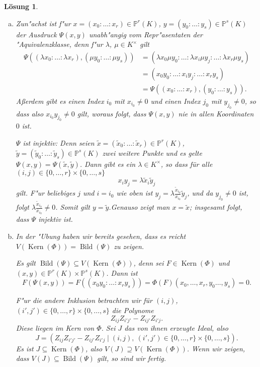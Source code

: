 \documentclass[a4paper, 12pt, numbers=noendperiod, chapterprefix=true, headsepline]{scrbook}
\theoremstyle{break}
\newtheorem{Loes}{L\"osung}
\theoremstyle{nonumberbreak}
\theoremstyle{nonumberplain}
\DeclareMathOperator{\Bild}{Bild}
\DeclareMathOperator{\Kern}{Kern}
\newcommand{\IP}{\mathbb{P}}%
\begin{document}
\begin{Loes}\begin{enumerate}[a)]
\item
	Zun"achst ist f"ur $x = (x_0:\ldots:x_r)\in \IP^r(K)$, $y = (y_0:\ldots:y_s)\in \IP^s(K)$ der Ausdruck $\Psi(x,y)$ unabh"angig vom Repr"asentaten der "Aquivalenzklasse, denn f"ur $\lambda$, $\mu \in K^\times$ gilt
	\begin{align*}
		\Psi((\lambda x_0:\ldots:\lambda x_r), (\mu y_0:\ldots:\mu y_s)) &= (\lambda x_0 \mu y_0: \ldots : \lambda x_i \mu y_j:\ldots: \lambda x_r \mu y_s )\\
		&= ( x_0y_0:\ldots: x_iy_j :\ldots: x_ry_s)\\
		&= \Psi((x_0:\ldots:x_r),(y_0:\ldots:y_s)).
	\end{align*}
	A\ss erdem gibt es einen Index $i_0$ mit $x_{i_0}\neq 0$ und einen Index $j_0$ mit $y_{j_0}\neq 0$, so dass also $x_{i_0}y_{j_0}\neq 0$ gilt, woraus folgt, dass $\Psi(x,y)$ nie in allen Koordinaten $0$ ist.
	
	\emph{$\Psi$ ist injektiv}: Denn seien $\tilde x =  (\tilde x_0:\ldots:\tilde x_r)\in \IP^r(K)$, $\tilde y = (\tilde y_0:\ldots:\tilde y_s)\in \IP^s(K)$ zwei weitere Punkte und es gelte $\Psi(x,y) = \Psi(\tilde x, \tilde y)$. Dann gibt es ein $\lambda\in K^\times$, so dass für alle $(i,j)\in \{0,\dots,r\}\times \{0,\dots, s\}$
		\[x_iy_j = \lambda \tilde x_i \tilde y_j\]
	gilt. F"ur beliebiges $j$ und $i = i_0$ wie oben ist $y_j = \lambda \tfrac{\tilde x_{i_0}}{x_{i_0}} \tilde y_j$, und da $y_{j_0}\neq 0$ ist, folgt $\lambda \tfrac{\tilde x_{i_0}}{x_{i_0}}\neq 0$. Somit gilt $y = \tilde y$.Genauso zeigt man $x= \tilde x$; insgesamt folgt, dass $\Psi$ injektiv ist.

\item
	In der "Ubung haben wir bereits gesehen, dass es reicht $V(\Kern(\Phi)) = \Bild(\Psi)$ zu zeigen.
	
	Es gilt $\Bild(\Psi)\subseteq V(\Kern(\Phi))$, denn sei $F\in \Kern(\Phi)$ und $(x,y)\in \IP^r(K)\times \IP^s(K)$. Dann ist
		\[F(\Psi(x,y)) = F(( x_0y_0:\ldots: x_ry_s)) = \Phi(F)(x_0,\ldots , x_r ,y_0\ldots ,y_s) = 0.\]
	
	F"ur die andere Inklusion betrachten wir für $(i,j)$, $(i',j') \in \{0,\dots,r\}\times\{0,\dots,s\}$ die Polynome
		\[Z_{ij}Z_{i'j'} - Z_{ij'}Z_{i'j}.\]
	Diese liegen im Kern von $\Phi$. Sei $J$ das von ihnen erzeugte Ideal, also
		\[J = (Z_{ij}Z_{i'j'} - Z_{ij'}Z_{i'j} \mid (i,j),\ (i',j') \in \{0,\dots,r\}\times\{0,\dots,s\}).\]
	Es ist $J\subseteq \Kern(\Phi)$, also $V(J)\supseteq V(\Kern(\Phi))$. Wenn wir zeigen, dass $V(J)\subseteq \Bild(\Psi)$ gilt, so sind wir fertig.


\end{enumerate}
\end{Loes}
\end{document}
